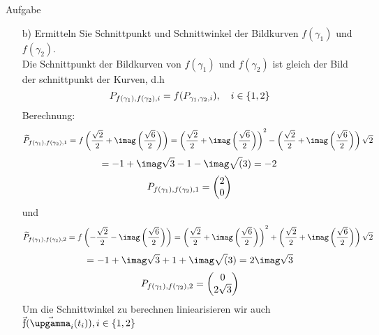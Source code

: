 \documentclass{scrartcl}
\begin{document}
\begin{section}{Aufgabe}
\begin{itemize}
\item[b)]
Ermitteln Sie Schnittpunkt und Schnittwinkel der Bildkurven $f(\gamma_1)$ und $f(\gamma_2)$.\\
Die Schnittpunkt der Bildkurven von $f(\gamma_1)$ und $f(\gamma_2)$ ist gleich der Bild der schnittpunkt der Kurven, d.h
\[P_{f(\gamma_1),f(\gamma_2),i}=f(P_{\gamma_1,\gamma_2,i}),\quad i\in\qty{1,2}\]
Berechnung:
\[\widetilde{P}_{f(\gamma_1),f(\gamma_2),1}=f\left(\frac{\sqrt{2}}{2}+\imag\left(\frac{\sqrt{6}}{2}\right)\right)=\left(\frac{\sqrt{2}}{2}+\imag\left(\frac{\sqrt{6}}{2}\right)\right)^2-\left(\frac{\sqrt{2}}{2}+\imag\left(\frac{\sqrt{6}}{2}\right)\right)\sqrt{2}\]
\[=-1+\imag \sqrt{3}-1 - \imag \sqrt(3)=-2\]
\[P_{f(\gamma_1),f(\gamma_2),1}=\begin{pmatrix}2\\0\end{pmatrix}\]
und
\[\widetilde{P}_{f(\gamma_1),f(\gamma_2),2}
=f\left(-\frac{\sqrt{2}}{2}-\imag\left(\frac{\sqrt{6}}{2}\right)\right)
=\left(\frac{\sqrt{2}}{2}+\imag\left(\frac{\sqrt{6}}{2}\right)\right)^2+\left(\frac{\sqrt{2}}{2}+\imag\left(\frac{\sqrt{6}}{2}\right)\right)\sqrt{2}\]
\[=-1+\imag \sqrt{3}+1 + \imag \sqrt(3)=2 \imag \sqrt 3\]
\[P_{f(\gamma_1),f(\gamma_2),2}=\begin{pmatrix}0\\2\sqrt 3\end{pmatrix}\]
\newcommand{\f}{\vec{\text{\fontshape{ui}\selectfont f}}}
Um die Schnittwinkel zu berechnen liniearisieren wir auch $\f(\vec{\upgamma}_i(t_i)), i \in \qty{1,2}$


\end{itemize}
\end{section}
\end{document}

